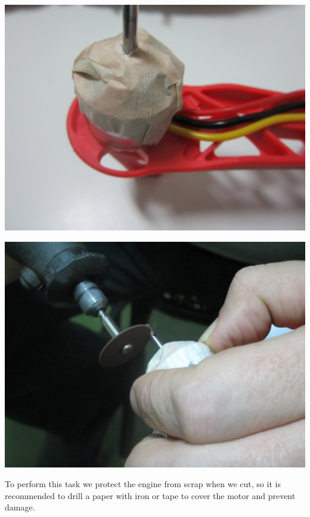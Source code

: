 \documentclass[12pt, a4paper,twoside]{tesi_upf}
\begin{document}
\begin{minipage}{0.5\textwidth}
  \centering
  \includegraphics[width=0.8\linewidth]{Images/Mounting/IMG_0432.jpg}
  \label{fig:app1}
\end{minipage}%
\begin{minipage}{0.5\textwidth}
  \centering
  \includegraphics[width=0.8\linewidth]{Images/Mounting/IMG_0435.jpg}
  \label{fig:app2}
\end{minipage}

To perform this task we protect the engine from scrap when we cut, so it is recommended to drill a paper with iron or tape to cover the motor and prevent damage.
\end{document}
